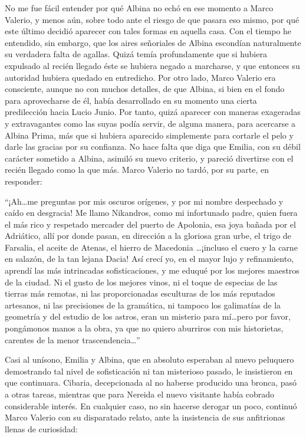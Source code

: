 \documentclass[11pt,openany]{book}
\begin{document}
No me fue fácil entender por qué Albina no echó en ese momento a Marco Valerio, y menos aún, sobre todo ante el riesgo de que pasara eso mismo,  por qué este último decidió aparecer con tales formas en aquella casa. Con el tiempo he entendido, sin embargo, que los aires señoriales de Albina escondían naturalmente su verdadera falta de agallas. Quizá temía profundamente que si hubiera expulsado al recién llegado éste se hubiera negado a marcharse, y que entonces su autoridad hubiera quedado en entredicho. Por otro lado, Marco Valerio era consciente, aunque no con muchos detalles, de que Albina, si bien en el fondo para aprovecharse de él, había desarrollado en su momento una cierta predilección hacia Lucio Junio. Por tanto, quizá aparecer con maneras exageradas y extravagantes como las suyas podía servir, de alguna manera, para acercarse a Albina Prima, más que si hubiera aparecido simplemente para cortarle el pelo y darle las gracias por su confianza. No hace falta que diga que Emilia, con su débil carácter sometido a Albina, asimiló su nuevo criterio, y pareció divertirse con el recién llegado como la que más. Marco Valerio no tardó, por su parte, en responder:

``¡Ah\dots me preguntas por mis oscuros orígenes, y por mi nombre despechado y caído en desgracia! Me llamo Nikandros, como mi infortunado padre, quien fuera el más rico y respetado mercader del puerto de Apolonia, esa joya bañada por el Adriático, allí por donde pasan, en dirección a la gloriosa gran urbe, el trigo de Farsalia, el aceite de Atenas, el hierro de Macedonia \dots ¡incluso el cuero y la carne en salazón, de la tan lejana Dacia! Así crecí yo, en el mayor lujo y refinamiento, aprendí las más intrincadas sofisticaciones, y me eduqué por los mejores maestros de la ciudad. Ni el gusto de los mejores vinos, ni el toque de especias de las tierras más remotas, ni las proporcionadas esculturas de los más reputados artesanos, ni las precisiones de la gramática, ni tampoco los galimatías de la geometría y del estudio de los astros, eran un misterio para mí\dots pero por favor, pongámonos manos a la obra, ya que no quiero aburriros con mis historietas, carentes de la menor trascendencia\dots''

Casi al unísono, Emilia y Albina, que en absoluto esperaban al nuevo peluquero demostrando tal nivel de sofisticación ni tan misterioso pasado, le insistieron en que continuara. Cibaria, decepcionada al no haberse producido una bronca, pasó a otras tareas, mientras que para Nereida el nuevo visitante había cobrado considerable interés. En cualquier caso, no sin hacerse derogar un poco, continuó Marco Valerio con su disparatado relato, ante la insistencia de sus anfitrionas llenas de curiosidad:
\end{document}
